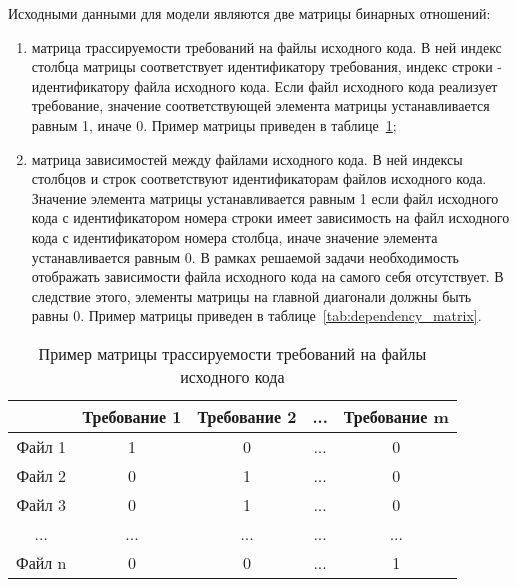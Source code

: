Исходными данными для модели являются две матрицы бинарных отношений:
\begin{enumerate}
    \item матрица трассируемости требований на файлы исходного кода. В ней индекс столбца матрицы соответствует идентификатору требования, индекс строки - идентификатору файла исходного кода. Если файл исходного кода реализует требование, значение соответствующей элемента матрицы устанавливается равным 1, иначе 0. Пример матрицы приведен в таблице~\ref{tab:requirements_traceability_matrix};
    \item матрица зависимостей между файлами исходного кода. В ней индексы столбцов и строк соответствуют идентификаторам файлов исходного кода. Значение элемента матрицы устанавливается равным 1 если файл исходного кода с идентификатором номера строки имеет зависимость на файл исходного кода с идентификатором номера столбца, иначе значение элемента устанавливается равным 0. В рамках решаемой задачи необходимость отображать зависимости файла исходного кода на самого себя отсутствует. В следствие этого, элементы матрицы на главной диагонали должны быть равны 0. Пример матрицы приведен в таблице~\ref{tab:dependency_matrix}.
\end{enumerate}

\begin{longtable}{|c|c|c|c|c|}
\caption{Пример матрицы трассируемости требований на файлы исходного кода}
\label{tab:requirements_traceability_matrix}\\
\hline
& \cellcolor{ash-grey} Требование 1 
& \cellcolor{ash-grey} Требование 2 
& ... 
& \cellcolor{ash-grey} Требование m \\
\hline
\cellcolor{platinum} Файл 1 & \cellcolor{light-colar} 1 & 0 & ... & 0 \\
\hline
\cellcolor{platinum} Файл 2 & 0 & \cellcolor{light-orange} 1 & ... & 0 \\
\hline
\cellcolor{platinum} Файл 3 & 0 & \cellcolor{crayola} 1 & ... & 0 \\
\hline
... & ... & ... & ... & ... \\
\hline
\cellcolor{platinum} Файл n & 0 & 0 & ... & \cellcolor{light-green} 1 \\
\hline
\end{longtable}


